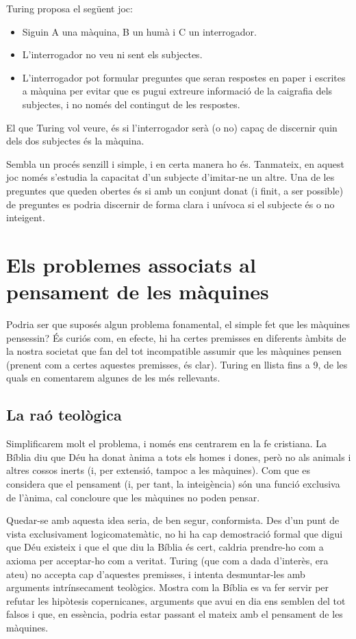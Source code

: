 \documentclass[a4paper, 11pt]{article}
\begin{document}
Turing proposa el següent joc:
\begin{itemize}
  \item Siguin A una màquina, B un humà i C un interrogador.
  \item L'interrogador no veu ni sent els subjectes.
  \item L'interrogador pot formular preguntes que seran respostes en paper i escrites a màquina per evitar que es pugui
        extreure informació de la ca\lgem{}igrafia dels subjectes, i no només del contingut de les respostes.
\end{itemize}

El que Turing vol veure, és si l'interrogador serà (o no) capaç de discernir quin dels dos subjectes és la màquina.

Sembla un procés senzill i simple, i en certa manera ho és. Tanmateix, en aquest joc només s'estudia la capacitat d'un
subjecte d'imitar-ne un altre. Una de les preguntes que queden obertes és si amb un conjunt donat (i finit, a ser
possible) de preguntes es podria discernir de forma clara i unívoca si el subjecte és o no inte\lgem{}igent.

\section*{Els problemes associats al pensament de les màquines}

Podria ser que suposés algun problema fonamental, el simple fet que les màquines pensessin? És curiós com, en efecte,
hi ha certes premisses en diferents àmbits de la nostra societat que fan del tot incompatible assumir que les màquines
pensen (prenent com a certes aquestes premisses, és clar). Turing en llista fins a 9, de les quals en comentarem
algunes de les més rellevants.

\subsection*{La raó teològica}

Simplificarem molt el problema, i només ens centrarem en la fe cristiana. La Bíblia diu que Déu ha donat ànima a tots
els homes i dones, però no als animals i altres cossos inerts (i, per extensió, tampoc a les màquines). Com que es
considera que el pensament (i, per tant, la inte\lgem{}igència) són una funció exclusiva de l'ànima, cal concloure que
les màquines no poden pensar.

Quedar-se amb aquesta idea seria, de ben segur, conformista. Des d'un punt de vista exclusivament logicomatemàtic, no
hi ha cap demostració formal que digui que Déu existeix i que el que diu la Bíblia és cert, caldria prendre-ho com a
axioma per acceptar-ho com a veritat. Turing (que com a dada d'interès, era ateu) no accepta cap d'aquestes premisses,
i intenta desmuntar-les amb arguments intrínsecament teològics. Mostra com la Bíblia es va fer servir per refutar les
hipòtesis copernicanes, arguments que avui en dia ens semblen del tot falsos i que, en essència, podria estar passant
el mateix amb el pensament de les màquines.
\end{document}
